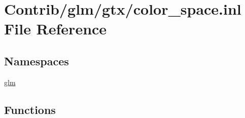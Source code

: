 \hypertarget{gtx_2color__space_8inl}{}\section{Contrib/glm/gtx/color\+\_\+space.inl File Reference}
\label{gtx_2color__space_8inl}
\subsection*{Namespaces}
\begin{DoxyCompactItemize}
\item 
 \mbox{\hyperlink{namespaceglm}{glm}}
\end{DoxyCompactItemize}
\subsection*{Functions}
